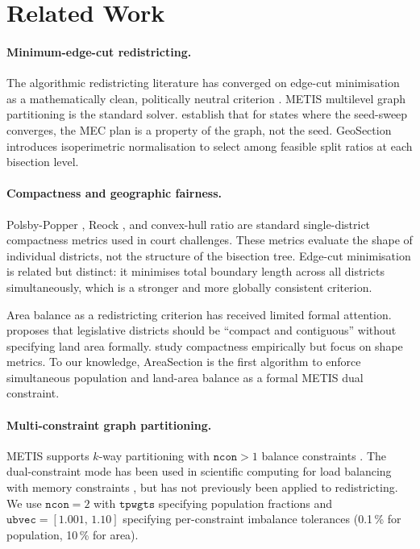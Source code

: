 \section{Related Work}
\label{sec:related}

\paragraph{Minimum-edge-cut redistricting.}
The algorithmic redistricting literature has converged on edge-cut minimisation
as a mathematically clean, politically neutral criterion
\citep{chikina2017,deford2019,duchin2020}.
METIS multilevel graph partitioning \citep{karypis1998} is the standard solver.
\citet{b7paper} establish that for states where the seed-sweep converges, the
MEC plan is a property of the graph, not the seed.
GeoSection \citep{b8paper} introduces isoperimetric normalisation to select
among feasible split ratios at each bisection level.

\paragraph{Compactness and geographic fairness.}
Polsby-Popper \citep{polsby1991}, Reock \citep{reock1961}, and convex-hull ratio
are standard single-district compactness metrics used in court challenges.
These metrics evaluate the shape of individual districts, not the structure of
the bisection tree.
Edge-cut minimisation is related but distinct: it minimises total boundary
length across all districts simultaneously, which is a stronger and
more globally consistent criterion.

Area balance as a redistricting criterion has received limited formal attention.
\citet{vickrey1961} proposes that legislative districts should be ``compact and
contiguous'' without specifying land area formally.
\citet{niemi1990} study compactness empirically but focus on shape metrics.
To our knowledge, AreaSection is the first algorithm to enforce simultaneous
population and land-area balance as a formal METIS dual constraint.

\paragraph{Multi-constraint graph partitioning.}
METIS supports $k$-way partitioning with $\mathtt{ncon} > 1$ balance constraints
\citep{karypis1999metis}.
The dual-constraint mode has been used in scientific computing for
load balancing with memory constraints \citep{devine2002,hendrickson1995},
but has not previously been applied to redistricting.
We use $\mathtt{ncon}=2$ with $\mathtt{tpwgts}$ specifying population fractions
and $\mathtt{ubvec}=[1.001,\, 1.10]$ specifying per-constraint imbalance
tolerances (0.1\,\% for population, 10\,\% for area).

